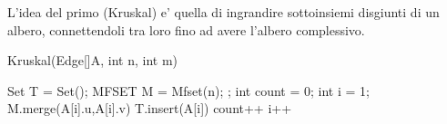 \documentclass[oneside]{book}
\begin{document}
L'idea del primo (Kruskal) e' quella di ingrandire sottoinsiemi disgiunti di un albero, connettendoli tra loro fino ad avere l'albero complessivo.

\begin{algorithm}
\caption{Kruskal(Edge[]A, int n, int m)\label{alg:cap}}

\begin{algorithmic}
\State Set T = Set();
\State MFSET M = Mfset(n);
;
\State int count = 0;
\State int i = 1;
	\State M.merge(A[i].u,A[i].v)
	\State T.insert(A[i])
	\State count++
	\EndIf
	\State i++
\EndWhile

\end{algorithmic}
\end{algorithm}
\end{document}
